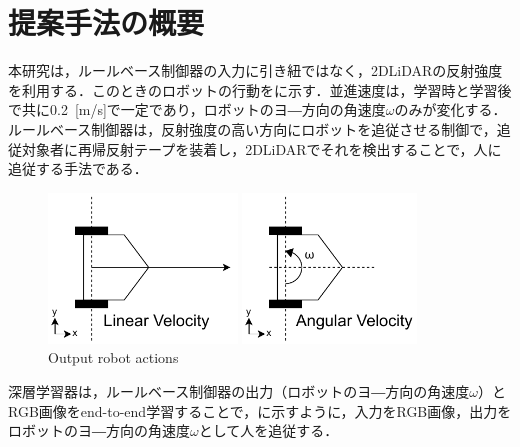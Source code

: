 
\section{提案手法の概要}

  本研究は，ルールベース制御器の入力に引き紐ではなく，2DLiDARの反射強度を利用する．このときのロボットの行動をに示す．並進速度は，学習時と学習後で共に0.2 \,[m/s]で一定であり，ロボットのヨ―方向の角速度$\omega$のみが変化する．ルールベース制御器は，反射強度の高い方向にロボットを追従させる制御で，追従対象者に再帰反射テープを装着し，2DLiDARでそれを検出することで，人に追従する手法である．

  \begin{figure}[h]
    \centering
    \begin{minipage}[c]{65mm} 
        \centering
        \includegraphics[height=40mm]{images/pdf/RobotGuidance_linear_velocity}
    \end{minipage}
    \begin{minipage}[c]{65mm} 
        \centering
        \includegraphics[height=40mm]{images/pdf/RobotGuidance_angular_velocity}
    \end{minipage}
    \caption{Output robot actions}
    \label{Fig:RobotGuidance_velocity}
  \end{figure}

\newpage

  深層学習器は，ルールベース制御器の出力（ロボットのヨ―方向の角速度$\omega$）とRGB画像をend-to-end学習することで，に示すように，入力をRGB画像，出力をロボットのヨ―方向の角速度$\omega$として人を追従する．

